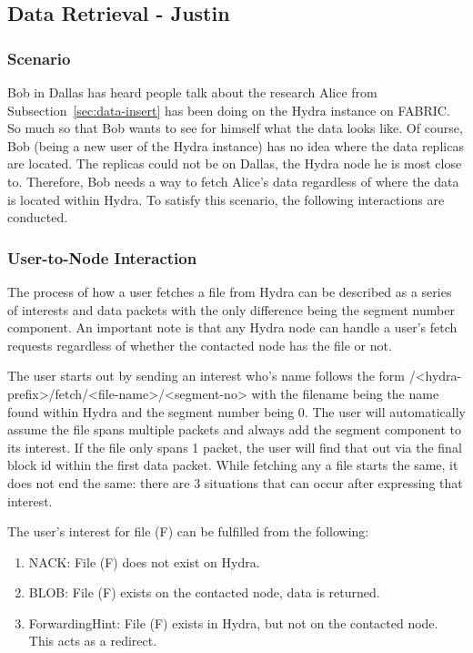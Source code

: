 \subsection{Data Retrieval - Justin} \label{sec:data-retrieve}


\subsubsection{Scenario}
Bob in Dallas has heard people talk about the research Alice from Subsection~\ref{sec:data-insert} has been doing on the Hydra instance on FABRIC. So much so that Bob wants to see for himself what the data looks like. Of course, Bob (being a new user of the Hydra instance) has no idea where the data replicas are located. The replicas could not be on Dallas, the Hydra node he is most close to. Therefore, Bob needs a way to fetch Alice's data regardless of where the data is located within Hydra. To satisfy this scenario, the following interactions are conducted.


\subsubsection{User-to-Node Interaction}
The process of how a user fetches a file from Hydra can be described as a series of interests and data packets with the only difference being the segment number component. An important note is that any Hydra node can handle a user's fetch requests regardless of whether the contacted node has the file or not.

The user starts out by sending an interest who's name follows the form /<hydra-prefix>/fetch/<file-name>/<segment-no> with the filename being the name found within Hydra and the segment number being 0. The user will automatically assume the file spans multiple packets and always add the segment component to its interest. If the file only spans 1 packet, the user will find that out via the final block id within the first data packet. While fetching any a file starts the same, it does not end the same: there are 3 situations that can occur after expressing that interest.

The user's interest for file (F) can be fulfilled from the following:
\begin{enumerate}
    \item NACK: File (F) does not exist on Hydra.
    \item BLOB: File (F) exists on the contacted node, data is returned.
    \item ForwardingHint: File (F) exists in Hydra, but not on the contacted node. This acts as a redirect.
\end{enumerate}

